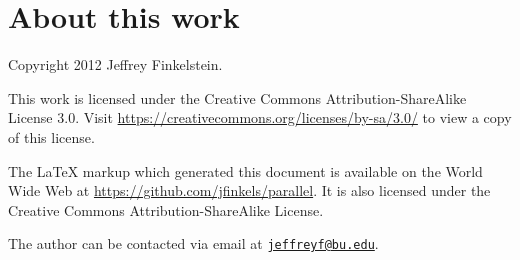 \documentclass{article}
\newcommand{\email}[1]{\href{mailto:#1}{\nolinkurl{#1}}}
\begin{document}
\section{About this work}

Copyright 2012 Jef{}frey Finkelstein.

This work is licensed under the Creative Commons Attribution-ShareAlike License 3.0.
Visit \mbox{\url{https://creativecommons.org/licenses/by-sa/3.0/}} to view a copy of this license.

The \LaTeX{} markup which generated this document is available on the World Wide Web at \mbox{\url{https://github.com/jfinkels/parallel}}.
It is also licensed under the Creative Commons Attribution-ShareAlike License.

The author can be contacted via email at \email{jeffreyf@bu.edu}.



\end{document}
